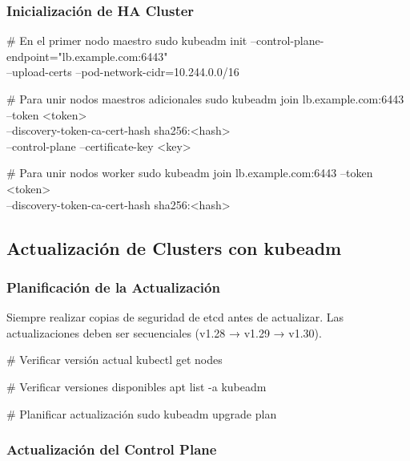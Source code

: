 \documentclass[11pt,a4paper]{article}
\begin{document}
\subsubsection{Inicialización de HA Cluster}

\begin{commandbox}
\# En el primer nodo maestro
sudo kubeadm init --control-plane-endpoint="lb.example.com:6443" \\
  --upload-certs --pod-network-cidr=10.244.0.0/16

\# Para unir nodos maestros adicionales
sudo kubeadm join lb.example.com:6443 --token <token> \\
  --discovery-token-ca-cert-hash sha256:<hash> \\
  --control-plane --certificate-key <key>

\# Para unir nodos worker
sudo kubeadm join lb.example.com:6443 --token <token> \\
  --discovery-token-ca-cert-hash sha256:<hash>
\end{commandbox}

\subsection{Actualización de Clusters con kubeadm}

\subsubsection{Planificación de la Actualización}

\begin{warningbox}
Siempre realizar copias de seguridad de etcd antes de actualizar. Las actualizaciones deben ser secuenciales (v1.28 → v1.29 → v1.30).
\end{warningbox}

\begin{commandbox}
\# Verificar versión actual
kubectl get nodes

\# Verificar versiones disponibles
apt list -a kubeadm

\# Planificar actualización
sudo kubeadm upgrade plan
\end{commandbox}

\subsubsection{Actualización del Control Plane}
\end{document}
